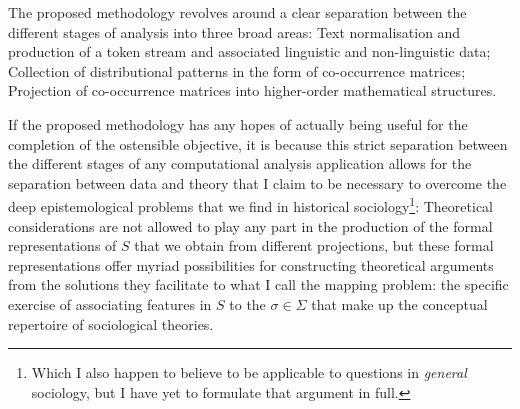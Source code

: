 The proposed methodology revolves around a clear separation between the different stages of analysis into three broad areas:
Text normalisation and production of a token stream and associated linguistic and non-linguistic data;
Collection of distributional patterns in the form of co-occurrence matrices;
Projection of co-occurrence matrices into higher-order mathematical structures.

If the proposed methodology has any hopes of actually being useful for the completion of the ostensible objective, it is because this strict separation between the different stages of any computational analysis application allows for the separation between data and theory that I claim to be necessary to overcome the deep epistemological problems that we find in historical sociology\footnote{
    Which I also happen to believe to be applicable to questions in \emph{general} sociology, but I have yet to formulate that argument in full.
}:
Theoretical considerations are not allowed to play any part in the production of the formal representations of $S$ that we obtain from different projections, but these formal representations offer myriad possibilities for constructing theoretical arguments from the solutions they facilitate to what I call the mapping problem: the specific exercise of associating features in $S$ to the $\sigma \in \Sigma$ that make up the conceptual repertoire of sociological theories.


